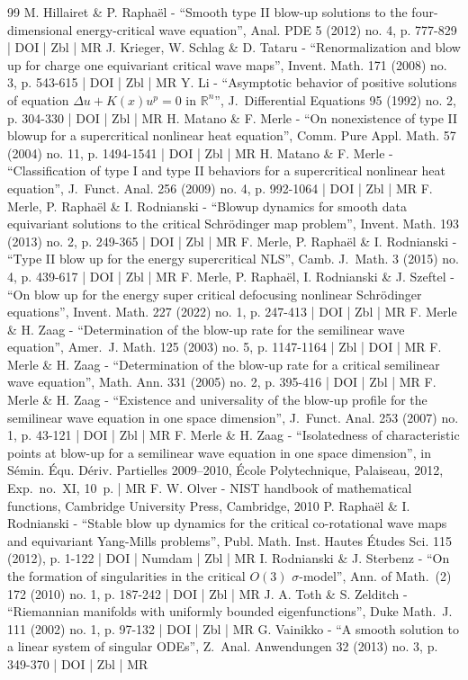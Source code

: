 \documentclass[10pt]{amsart}
\theoremstyle{plain}
\theoremstyle{definition}
\begin{document}
\begin{thebibliography}{99}
M. Hillairet \& P. Raphaël - “Smooth type II blow-up solutions to the four-dimensional energy-critical wave equation”, Anal. PDE 5 (2012) no. 4, p. 777-829 | DOI | Zbl | MR
J. Krieger, W. Schlag \& D. Tataru - “Renormalization and blow up for charge one equivariant critical wave maps”, Invent. Math. 171 (2008) no. 3, p. 543-615 | DOI | Zbl | MR
Y. Li - “Asymptotic behavior of positive solutions of equation $\Delta u+ K (x) u^p= 0$ in $\mathbb{R}^n$”, J. Differential Equations 95 (1992) no. 2, p. 304-330 | DOI | Zbl | MR
H. Matano \& F. Merle - “On nonexistence of type II blowup for a supercritical nonlinear heat equation”, Comm. Pure Appl. Math. 57 (2004) no. 11, p. 1494-1541 | DOI | Zbl | MR
H. Matano \& F. Merle - “Classification of type I and type II behaviors for a supercritical nonlinear heat equation”, J. Funct. Anal. 256 (2009) no. 4, p. 992-1064 | DOI | Zbl | MR
F. Merle, P. Raphaël \& I. Rodnianski - “Blowup dynamics for smooth data equivariant solutions to the critical Schrödinger map problem”, Invent. Math. 193 (2013) no. 2, p. 249-365 | DOI | Zbl | MR
F. Merle, P. Raphaël \& I. Rodnianski - “Type II blow up for the energy supercritical NLS”, Camb. J. Math. 3 (2015) no. 4, p. 439-617 | DOI | Zbl | MR
F. Merle, P. Raphaël, I. Rodnianski \& J. Szeftel - “On blow up for the energy super critical defocusing nonlinear Schrödinger equations”, Invent. Math. 227 (2022) no. 1, p. 247-413 | DOI | Zbl | MR
F. Merle \& H. Zaag - “Determination of the blow-up rate for the semilinear wave equation”, Amer. J. Math. 125 (2003) no. 5, p. 1147-1164 | Zbl | DOI | MR
F. Merle \& H. Zaag - “Determination of the blow-up rate for a critical semilinear wave equation”, Math. Ann. 331 (2005) no. 2, p. 395-416 | DOI | Zbl | MR
F. Merle \& H. Zaag - “Existence and universality of the blow-up profile for the semilinear wave equation in one space dimension”, J. Funct. Anal. 253 (2007) no. 1, p. 43-121 | DOI | Zbl | MR
F. Merle \& H. Zaag - “Isolatedness of characteristic points at blow-up for a semilinear wave equation in one space dimension”, in Sémin. Équ. Dériv. Partielles 2009–2010, École Polytechnique, Palaiseau, 2012, Exp. no. XI, 10 p. | MR
F. W. Olver - NIST handbook of mathematical functions, Cambridge University Press, Cambridge, 2010
P. Raphaël \& I. Rodnianski - “Stable blow up dynamics for the critical co-rotational wave maps and equivariant Yang-Mills problems”, Publ. Math. Inst. Hautes Études Sci. 115 (2012), p. 1-122 | DOI | Numdam | Zbl | MR
I. Rodnianski \& J. Sterbenz - “On the formation of singularities in the critical $O(3)$ $\sigma $-model”, Ann. of Math. (2) 172 (2010) no. 1, p. 187-242 | DOI | Zbl | MR
J. A. Toth \& S. Zelditch - “Riemannian manifolds with uniformly bounded eigenfunctions”, Duke Math. J. 111 (2002) no. 1, p. 97-132 | DOI | Zbl | MR
G. Vainikko - “A smooth solution to a linear system of singular ODEs”, Z. Anal. Anwendungen 32 (2013) no. 3, p. 349-370 | DOI | Zbl | MR
\end{thebibliography}
\end{document}
